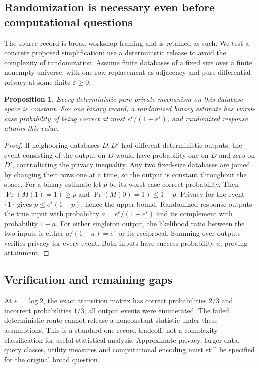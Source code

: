 \documentclass[11pt]{article}
\newtheorem{proposition}{Proposition}
\begin{document}
\subsection{Randomization is necessary even before computational questions}
The source record is broad workshop framing and is retained as such. We test a concrete proposed simplification: use a deterministic release to avoid the complexity of randomization. Assume finite databases of a fixed size over a finite nonempty universe, with one-row replacement as adjacency and pure differential privacy at some finite $\varepsilon\ge0$.
\begin{proposition}
Every deterministic pure-private mechanism on this database space is constant. For one binary record, a randomized binary estimate has worst-case probability of being correct at most $e^\varepsilon/(1+e^\varepsilon)$, and randomized response attains this value.
\end{proposition}
\begin{proof}
If neighboring databases $D,D'$ had different deterministic outputs, the event consisting of the output on $D$ would have probability one on $D$ and zero on $D'$, contradicting the privacy inequality. Any two fixed-size databases are joined by changing their rows one at a time, so the output is constant throughout the space.
For a binary estimate let $p$ be its worst-case correct probability. Then $\Pr(M(1)=1)\ge p$ and $\Pr(M(0)=1)\le1-p$. Privacy for the event $\{1\}$ gives $p\le e^\varepsilon(1-p)$, hence the upper bound. Randomized response outputs the true input with probability $a=e^\varepsilon/(1+e^\varepsilon)$ and its complement with probability $1-a$. For either singleton output, the likelihood ratio between the two inputs is either $a/(1-a)=e^\varepsilon$ or its reciprocal. Summing over outputs verifies privacy for every event. Both inputs have success probability $a$, proving attainment.
\end{proof}
\subsection{Verification and remaining gaps}
At $\varepsilon=\log2$, the exact transition matrix has correct probabilities $2/3$ and incorrect probabilities $1/3$; all output events were enumerated. The failed deterministic route cannot release a nonconstant statistic under these assumptions. This is a standard one-record tradeoff, not a complexity classification for useful statistical analysis. Approximate privacy, larger data, query classes, utility measures and computational encoding must still be specified for the original broad question.
\end{document}

